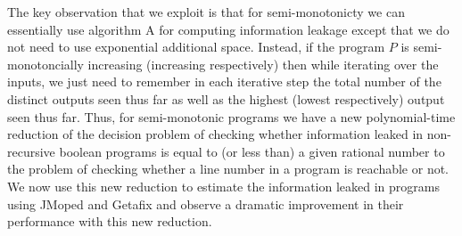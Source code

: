 The key observation that we exploit is that for semi-monotonicty we can essentially use algorithm A for computing information leakage except that we do not need to use exponential additional space. Instead, if the program $P$ is semi-monotoncially increasing (increasing respectively) then while iterating over the inputs,  we just need to remember in each iterative step  the total number of the distinct outputs seen thus far as well as the highest  (lowest respectively) output seen thus far. Thus, for semi-monotonic programs we have a new polynomial-time reduction of the decision problem of checking whether information leaked  in non-recursive boolean programs is  equal to (or less than) a given rational number to the problem of checking whether a line number in a program is reachable or not.  We now use this new reduction to estimate the information leaked in programs using JMoped and Getafix and  observe a dramatic improvement in their performance with this new reduction.



  
  













